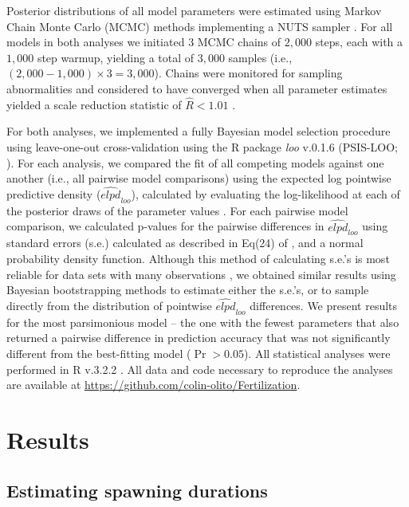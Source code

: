 \documentclass{article}
\begin{document}
	Posterior distributions of all model parameters were estimated using Markov Chain Monte Carlo (MCMC) methods implementing a NUTS sampler \citep{Stan2016}. For all models in both analyses we initiated $3$ MCMC chains of $2,000$ steps, each with a $1,000$ step warmup, yielding a total of $3,000$ samples (i.e., $(2,000 - 1,000) \times 3 = 3,000$). Chains were monitored for sampling abnormalities and considered to have converged when all parameter estimates yielded a scale reduction statistic of $\hat{R} < 1.01$ \citep{GelmanRubin1992}.

	For both analyses, we implemented a fully Bayesian model selection procedure using leave-one-out cross-validation using the R package \textit{loo} v.0.1.6 (PSIS-LOO; \citealt{Vehtari2016}). For each analysis, we compared the fit of all competing models against one another (i.e., all pairwise model comparisons) using the expected log pointwise predictive density ($\widehat{\textit{elpd}}_{\textit{loo}}$), calculated by evaluating the log-likelihood at each of the posterior draws of the parameter values \citep{HootenHobbs2015,Vehtari2016}. For each pairwise model comparison, we calculated p-values for the pairwise differences in $\widehat{\textit{elpd}}_{\textit{loo}}$ using standard errors (s.e.) calculated as described in Eq(24) of \citet{Vehtari2016}, and a normal probability density function. Although this method of calculating s.e.'s is most reliable for data sets with many observations \citep{Vehtari2016}, we obtained similar results using Bayesian bootstrapping methods to estimate either the s.e.'s, or to sample directly from the distribution of pointwise $\widehat{\textit{elpd}}_{\textit{loo}}$ differences. We present results for the most parsimonious model -- the one with the fewest parameters that also returned a pairwise difference in prediction accuracy that was not significantly different from the best-fitting model ($\Pr > 0.05$). All statistical analyses were performed in R v.3.2.2 \citep{R2016}. All data and code necessary to reproduce the analyses are available at \url{https://github.com/colin-olito/Fertilization}. 
	

\section{Results}

	\subsection*{Estimating spawning durations}
\end{document}
